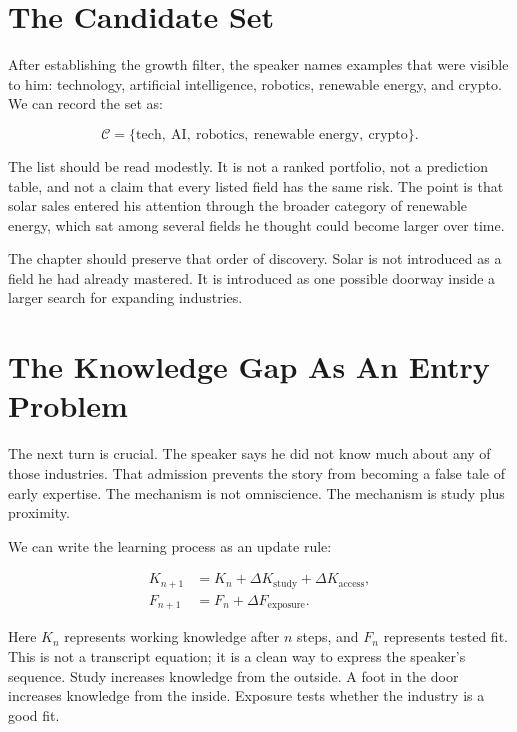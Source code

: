 \section{The Candidate Set}

After establishing the growth filter, the speaker names examples that were visible to him: technology, artificial intelligence, robotics, renewable energy, and crypto. We can record the set as:

\begin{equation}
\mathcal{C}
=
\{\text{tech},\ \text{AI},\ \text{robotics},\ \text{renewable energy},\ \text{crypto}\}.
\end{equation}

The list should be read modestly. It is not a ranked portfolio, not a prediction table, and not a claim that every listed field has the same risk. The point is that solar sales entered his attention through the broader category of renewable energy, which sat among several fields he thought could become larger over time.

The chapter should preserve that order of discovery. Solar is not introduced as a field he had already mastered. It is introduced as one possible doorway inside a larger search for expanding industries.

\section{The Knowledge Gap As An Entry Problem}

The next turn is crucial. The speaker says he did not know much about any of those industries. That admission prevents the story from becoming a false tale of early expertise. The mechanism is not omniscience. The mechanism is study plus proximity.

We can write the learning process as an update rule:

\begin{align}
K_{n+1} &= K_n
+ \Delta K_{\text{study}}
+ \Delta K_{\text{access}},\\
F_{n+1} &= F_n
+ \Delta F_{\text{exposure}}.
\end{align}

Here \(K_n\) represents working knowledge after \(n\) steps, and \(F_n\) represents tested fit. This is not a transcript equation; it is a clean way to express the speaker's sequence. Study increases knowledge from the outside. A foot in the door increases knowledge from the inside. Exposure tests whether the industry is a good fit.

